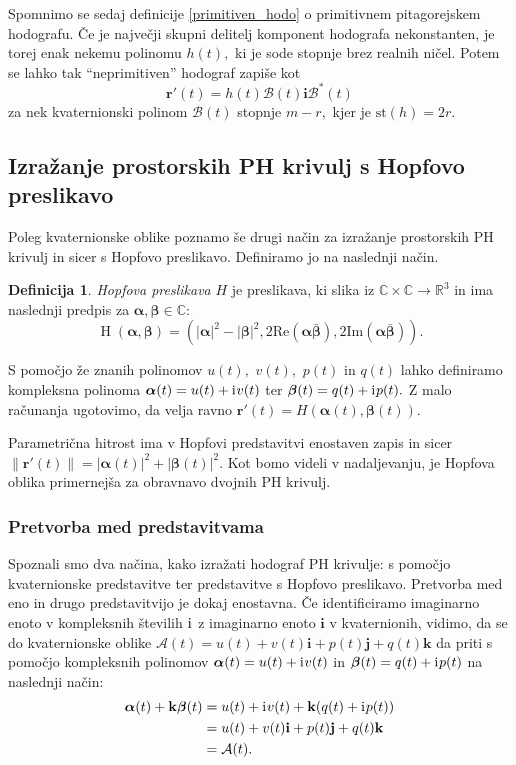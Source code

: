 \documentclass[12pt,a4paper,twoside]{article}
\newcommand{\iu}{\mathrm{i}\mkern1mu} %
\theoremstyle{definition} %
\newtheorem{definicija}{Definicija}[section]
\theoremstyle{plain} %
\numberwithin{equation}{section}  %
\newcommand{\R}{\mathbb R}
\renewcommand{\C}{\mathbb C}
\newcommand{\rV}{\mathbf{r}}
\newcommand{\iV}{\mathbf{i}}
\newcommand{\jV}{\mathbf{j}}
\newcommand{\kV}{\mathbf{k}}
\newcommand{\AQ}{\mathcal{A}}
\newcommand{\BQ}{\mathcal{B}}
\newcommand{\balpha}{\boldsymbol \alpha}
\newcommand{\bbeta}{\boldsymbol \beta}
\DeclareMathOperator{\hopf}{H}
\begin{document}
Spomnimo se sedaj definicije \ref{primitiven_hodo} o primitivnem pitagorejskem hodografu. Če je največji skupni delitelj komponent hodografa nekonstanten, je torej enak nekemu polinomu $h(t),$ ki je sode stopnje brez realnih ničel. Potem se lahko tak ``neprimitiven'' hodograf zapiše kot
\begin{equation}
	\label{Bkvaternion}
	\rV'(t)=h(t)\BQ(t)\iV\BQ^*(t)
\end{equation}
za nek kvaternionski polinom $\BQ(t)$ stopnje $m-r,$ kjer je $\mathrm{st}(h)=2r.$

\subsection{Izražanje prostorskih PH krivulj s Hopfovo preslikavo}
\label{hopf}

Poleg kvaternionske oblike poznamo še drugi način za izražanje prostorskih PH krivulj in sicer s Hopfovo preslikavo. Definiramo jo na naslednji način.
\begin{definicija}
	\label{hopf_def}
	\emph{Hopfova preslikava} $H$ je preslikava, ki slika iz $\C \times \C \to \R^3$ in ima naslednji predpis za $\balpha, \bbeta \in \C:$
	\begin{equation}
		\label{hoph}
		\hopf(\balpha, \bbeta)=(|\balpha|^2-|\bbeta|^2,2\mathrm{Re}(\balpha \bar{\bbeta}),2\mathrm{Im}(\balpha \bar{\bbeta})).
	\end{equation}
\end{definicija}
S pomočjo že znanih polinomov $u(t),$ $v(t),$ $p(t)$ in $q(t)$ lahko definiramo kompleksna polinoma $\balpha(t)=u(t)+\iu v(t)$ ter $\bbeta(t)=q(t)+\iu p(t).$ Z malo računanja ugotovimo, da velja ravno $\rV'(t)=H(\balpha(t),\bbeta(t)).$

Parametrična hitrost ima v Hopfovi predstavitvi enostaven zapis in sicer \\ $\lVert \rV'(t) \rVert=|\balpha(t)|^2+|\bbeta(t)|^2.$ Kot bomo videli v nadaljevanju, je Hopfova oblika primernejša za obravnavo dvojnih PH krivulj.

\subsubsection{Pretvorba med predstavitvama}

Spoznali smo dva načina, kako izražati hodograf PH krivulje: s pomočjo kvaternionske predstavitve ter predstavitve s Hopfovo preslikavo. Pretvorba med eno in drugo predstavitvijo je dokaj enostavna. Če identificiramo imaginarno enoto v kompleksnih številih $\iu$ z imaginarno enoto $\iV$ v kvaternionih, vidimo, da se do kvaternionske oblike $\AQ(t)=u(t)+v(t)\iV+p(t)\jV+q(t)\kV$ da priti s pomočjo kompleksnih polinomov $\balpha(t)=u(t)+\iu v(t)$ in $\bbeta(t)=q(t)+\iu p(t)$ na naslednji način:
\begin{align}
	\label{comp_to_quat}
	\balpha(t)+\kV\bbeta(t) &= u(t)+\iu v(t)+\kV(q(t)+ \iu p(t)) \nonumber \\
	&=u(t)+v(t)\iV + p(t)\jV+ q(t)\kV \nonumber \\
	&= \AQ(t).
\end{align}
\end{document}
